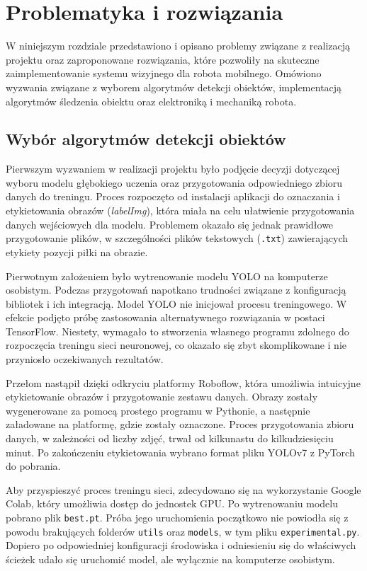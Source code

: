 \documentclass[a4paper,twoside,12pt]{book}
\begin{document}
\chapter{Problematyka i rozwiązania}
\label{ch:06}
W niniejszym rozdziale przedstawiono i opisano problemy związane z realizacją projektu oraz zaproponowane rozwiązania, które pozwoliły na skuteczne zaimplementowanie systemu wizyjnego dla robota mobilnego. Omówiono wyzwania związane z wyborem algorytmów detekcji obiektów, implementacją algorytmów śledzenia obiektu oraz elektroniką i mechaniką robota.

\section{Wybór algorytmów detekcji obiektów}

Pierwszym wyzwaniem w realizacji projektu było podjęcie decyzji dotyczącej wyboru modelu głębokiego uczenia oraz przygotowania odpowiedniego zbioru danych do treningu. Proces rozpoczęto od instalacji aplikacji do oznaczania i etykietowania obrazów (\textit{labelImg}), która miała na celu ułatwienie przygotowania danych wejściowych dla modelu. Problemem okazało się jednak prawidłowe przygotowanie plików, w szczególności plików tekstowych (\texttt{.txt}) zawierających etykiety pozycji piłki na obrazie.

Pierwotnym założeniem było wytrenowanie modelu YOLO na komputerze osobistym. Podczas przygotowań napotkano trudności związane z konfiguracją bibliotek i ich integracją. Model YOLO nie inicjował procesu treningowego. W efekcie podjęto próbę zastosowania alternatywnego rozwiązania w postaci TensorFlow. Niestety, wymagało to stworzenia własnego programu zdolnego do rozpoczęcia treningu sieci neuronowej, co okazało się zbyt skomplikowane i nie przyniosło oczekiwanych rezultatów.

Przełom nastąpił dzięki odkryciu platformy Roboflow, która umożliwia intuicyjne etykietowanie obrazów i przygotowanie zestawu danych. Obrazy zostały wygenerowane za pomocą prostego programu w Pythonie, a następnie załadowane na platformę, gdzie zostały oznaczone. Proces przygotowania zbioru danych, w zależności od liczby zdjęć, trwał od kilkunastu do kilkudziesięciu minut. Po zakończeniu etykietowania wybrano format pliku YOLOv7 z PyTorch do pobrania.

Aby przyspieszyć proces treningu sieci, zdecydowano się na wykorzystanie Google Colab, który umożliwia dostęp do jednostek GPU. Po wytrenowaniu modelu pobrano plik \texttt{best.pt}. Próba jego uruchomienia początkowo nie powiodła się z powodu brakujących folderów \texttt{utils} oraz \texttt{models}, w tym pliku \texttt{experimental.py}. Dopiero po odpowiedniej konfiguracji środowiska i odniesieniu się do właściwych ścieżek udało się uruchomić model, ale wyłącznie na komputerze osobistym.
\end{document}

